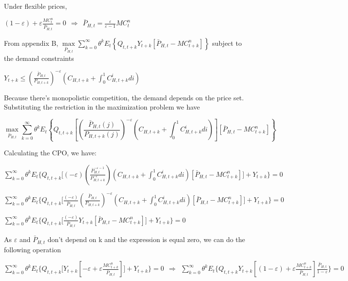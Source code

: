 \documentclass[
]{article}
\begin{document}
Under flexible prices,

\(\displaystyle (1-\varepsilon)+\varepsilon\frac{MC_{t}^n}{\bar{P}_{H,t}}=0 \ \ \Rightarrow \ \ \bar{P}_{H,t} =\frac{\varepsilon}{\varepsilon-1}MC_{t}^n\)

From appendix B,
\(\displaystyle \underset{\bar{P}_{H,t}} \max \sum_{k=0}^\infty \theta^kE_t \left\{ Q_{t,t+k} Y_{t+k} \left[ \bar{P}_{H,t}-MC_{t+k}^n\right] \right\}\)
subject to the demand constraints

\(\displaystyle Y_{t+k} \leq \left( \frac{\bar{P}_{H,t}}{P_{H,t+k}} \right)^{-\varepsilon} \left( C_{H,t+k}+\int_0^1 C_{H,t+k}^idi\right)\)

Because there's monopolistic competition, the demand depends on the
price set. Substituting the restriction in the maximization problem we
have

\[\displaystyle \underset{\bar{P}_{H,t}} \max \sum_{k=0}^\infty \theta^kE_t \left\{ Q_{t,t+k} \left[   \left( \frac{\bar{P}_{H,t}(j)}{P_{H,t+k}(j)} \right)^{-\varepsilon} \left( C_{H,t+k}+\int_0^1 C_{H,t+k}^idi\right) \right] \left[ \bar{P}_{H,t}-MC_{t+k}^n\right]\right\}\]

Calculating the CPO, we have:

\(\displaystyle \sum_{k=0}^\infty \theta^kE_t \Bigg\{ Q_{t,t+k} \Bigg[ (-\varepsilon) \left( \frac{\bar{P}_{H,t}^{-\varepsilon-1} }{P_{H,t+k}^{-\varepsilon} } \right)\left( C_{H,t+k}+\int_0^1 C_{H,t+k}^idi \right) \left[ \bar{P}_{H,t}-MC_{t+k}^n\right] \Bigg] + Y_{t+k} \Bigg\} = 0\)

\(\displaystyle \sum_{k=0}^\infty \theta^kE_t \Bigg\{ Q_{t,t+k} \Bigg[ \frac{(-\varepsilon)}{\bar{P}_{H,t}} \left( \frac{\bar{P}_{H,t}}{P_{H,t+k}} \right)^{-\varepsilon} \left( C_{H,t+k}+\int_0^1 C_{H,t+k}^idi \right) \left[ \bar{P}_{H,t}-MC_{t+k}^n\right] \Bigg] + Y_{t+k} \Bigg\} = 0\)

\(\displaystyle \sum_{k=0}^\infty \theta^kE_t \Bigg\{ Q_{t,t+k} \Bigg[ \frac{(-\varepsilon)}{\bar{P}_{H,t}} Y_{t+k } \left[ \bar{P}_{H,t}-MC_{t+k}^n\right] \Bigg] + Y_{t+k} \Bigg\} = 0\)

As \(\varepsilon\) and \(\bar{P}_{H,t}\) don't depend on k and the
expression is equal zero, we can do the following operation

\(\displaystyle \sum_{k=0}^\infty \theta^kE_t \Bigg\{ Q_{t,t+k} \Bigg[ Y_{t+k } \left[ -\varepsilon+\varepsilon \frac{MC_{t+k}^n}{\bar{P}_{H,t}} \right] \Bigg] + Y_{t+k} \Bigg\} = 0 \ \ \Rightarrow \ \ \sum_{k=0}^\infty \theta^kE_t \Bigg\{ Q_{t,t+k} Y_{t+k } \left[ (1-\varepsilon)+\varepsilon \frac{MC_{t+k}^n}{\bar{P}_{H,t}} \right] \frac{\bar{P}_{H,t}}{1-\varepsilon} \Bigg\} = 0\)
\end{document}
